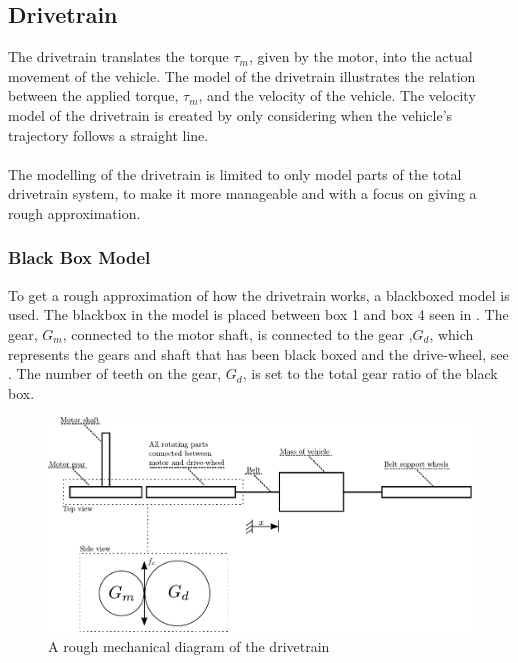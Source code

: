 \subsection{Drivetrain}\label{Drivetrain}

The drivetrain translates the torque $\tau_m$, given by the motor, into the actual movement of the vehicle. The model of the drivetrain illustrates the relation between the applied torque, $\tau_m$, and the velocity of the vehicle. The velocity model of the drivetrain is created by only considering when the vehicle's trajectory follows a straight line.\\\\
%
The modelling of the drivetrain is limited to only model parts of the total drivetrain system, to make it more manageable and with a focus on giving a rough approximation.
\subsubsection{Black Box Model}\label{BlackBoxModel}
To get a rough approximation of how the drivetrain works, a blackboxed model is used. The blackbox in the model is placed between box 1 and box 4 seen in  . The gear, $G_m$, connected to the motor shaft, is connected to the gear ,$G_d$, which represents the gears and shaft that has been black boxed and the drive-wheel, see . The number of teeth on the gear, $G_d$, is set to the total gear ratio of the black box.

\begin{figure}[H]
	\centering
	\includegraphics[scale=0.8]{figures/mechanicalDrawingSystem.pdf}
	\caption{A rough mechanical diagram of the drivetrain}
	\label{fig:DrivetrainMechanicalModel}
\end{figure}

